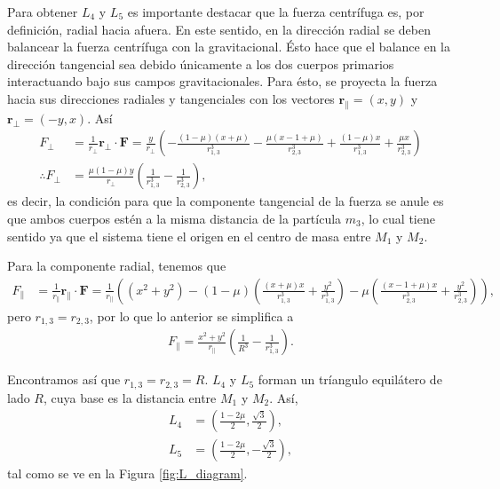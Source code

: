 Para obtener $L_4$ y $L_5$ es importante destacar que la fuerza centrífuga es, por definición, radial hacia afuera. En este sentido, en la dirección radial se deben balancear la fuerza centrífuga con la gravitacional. Ésto hace que el balance en la dirección tangencial sea debido únicamente a los dos cuerpos primarios interactuando bajo sus campos gravitacionales. Para ésto, se proyecta la fuerza hacia sus direcciones radiales y tangenciales con los vectores $\mathbf{r}_{\parallel} = (x,y)$ y $\mathbf{r}_{\bot} = (-y,x)$. Así
\begin{align*}
 F_{\bot} &= \frac{1}{r_{\bot}} \mathbf{r}_{\bot} \cdot \mathbf{F} = \frac{y}{r_{\bot}} \left( - \frac{(1-\mu)(x + \mu)}{ r_{1,3}^3 } - \frac{\mu(x - 1 +\mu )}{ r_{2,3}^3 } + \frac{(1-\mu)x}{ r_{1,3}^3 } + \frac{\mu x}{ r_{2,3}^3 } \right) \\
 \therefore F_{\bot} &= \frac{ \mu(1-\mu) y}{r_{\bot}} \left( \frac{1}{r_{1,3}^3} - \frac{1}{r_{2,3}^3} \right),
\end{align*}
es decir, la condición para que la componente tangencial de la fuerza se anule es que ambos cuerpos estén a la misma distancia de la partícula $m_3$, lo cual tiene sentido ya que el sistema tiene el origen en el centro de masa entre $M_1$ y $M_2$. 

Para la componente radial, tenemos que
\begin{align*}
 F_{\parallel} &= \frac{1}{r_{\parallel}} \mathbf{r}_{\parallel} \cdot \mathbf{F} = \frac{1}{r_\parallel} \left( (x^2 + y^2) -  (1-\mu) \left( \frac{(x+ \mu)x}{r_{1,3}^3} + \frac{y^2}{r_{1,3}^3} \right) - \mu \left( \frac{(x - 1 +\mu) x}{r_{2,3}^3} + \frac{y^2}{r_{2,3}^3} \right) \right),
\end{align*}
pero $r_{1,3} = r_{2,3}$, por lo que lo anterior se simplifica a 
\begin{align*}
 F_{\parallel} = \frac{x^2 + y^2}{r_\parallel} \left( \frac{1}{R^3} - \frac{1}{r_{1,3}^3} \right).
\end{align*}

Encontramos así que $r_{1,3} = r_{2,3} = R$. $L_4$ y $L_5$ forman un tríangulo equilátero de lado $R$, cuya base es la distancia entre $M_1$ y $M_2$. Así,
\begin{align}
 L_4 &= \left( \frac{1 - 2\mu}{2}, \frac{\sqrt{3}}{2} \right), \\
 L_5 &= \left( \frac{1 - 2\mu}{2} , -\frac{\sqrt{3}}{2} \right),
 \label{eq:L4_L5}
\end{align} 
tal como se ve en la Figura \ref{fig:L_diagram}.

